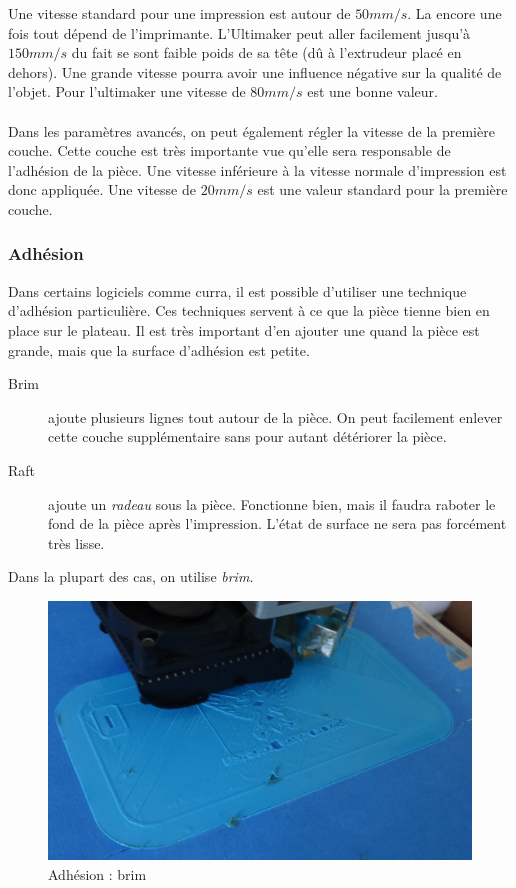 Une vitesse standard pour une impression est autour de $50mm/s$. La encore une fois tout dépend de l'imprimante. L'Ultimaker peut aller facilement jusqu'à $150mm/s$ du fait se sont faible poids de sa tête (dû à l'extrudeur placé en dehors). Une grande vitesse pourra avoir une influence négative sur la qualité de l'objet. Pour l'ultimaker une vitesse de $80mm/s$ est une bonne valeur.

\paragraph{} Dans les paramètres avancés, on peut également régler la vitesse de la première couche. Cette couche est très importante vue qu'elle sera responsable de l'adhésion de la pièce. Une vitesse inférieure à la vitesse normale d'impression est donc appliquée. Une vitesse de $20mm/s$ est une valeur standard pour la première couche.

\subsubsection{Adhésion}

Dans certains logiciels comme curra, il est possible d'utiliser une technique d'adhésion particulière. Ces techniques servent à ce que la pièce tienne bien en place sur le plateau. Il est très important d'en ajouter une quand la pièce est grande, mais que la surface d'adhésion est petite.

\begin{description}
\item [Brim] ajoute plusieurs lignes tout autour de la pièce. On peut facilement enlever cette couche supplémentaire sans pour autant détériorer la pièce. 
\item[Raft] ajoute un \emph{radeau} sous la pièce. Fonctionne bien, mais il faudra raboter le fond de la pièce après l'impression. L'état de surface ne sera pas forcément très lisse.
\end{description}

Dans la plupart des cas, on utilise \emph{brim}.

\begin{figure}[H]
	\centering
	\includegraphics[width=50ex]{03_logiciel/brim.jpg}  
	\caption{Adhésion : brim}
	\label{fig:brim}
\end{figure}

